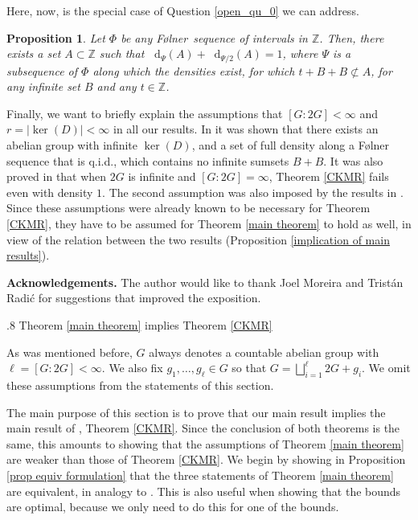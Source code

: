 \documentclass[reqno]{amsart}
\makeatletter
\def\Z{{\mathbb Z}}
\newcommand*\diff{\mathop{}\!\mathrm{d}}
\newtheorem{proposition}[theorem]{Proposition}
\theoremstyle{definition}
\theoremstyle{remark}
\def\section{\@startsection{section}{1}%
  \z@{.5\linespacing\@plus.7\linespacing}
{.8\baselineskip}%
  {\normalfont\fontsize{11}{13}\centering\bfseries}%
}
\theoremstyle{remark}
\newcommand{\Folner}{F\o{}lner}
\makeatother
\begin{document}
Here, now, is the special case of Question 
\ref{open_qu_0} we can address. 

\begin{proposition}\label{optimality in Z intro}
Let $\Phi$ be any \Folner\ sequence of intervals in $\Z$. 
Then, there 
exists a set $A\subset \Z$ such that 
$\diff_{\Psi}(A)+\diff_{\Psi/2}(A)=1$, 
where $\Psi$ is a subsequence of $\Phi$ along which the 
densities exist, for which $t+B+B \not \subset A$, for any 
infinite set $B$ 
and any $t\in \Z$.
\end{proposition}

Finally, we want to briefly explain the assumptions that 
$[G:2G]<\infty$ and $r=|\ker(D)|<\infty$ in all our results. 
In 
\cite[Section 5.1]{charamaras_kousek_mountakis_radic2025BBingroups} it was 
shown that there exists an abelian group with infinite 
$\ker(D)$, and a set of full density along a \Folner{} 
sequence that is q.i.d., which contains no infinite sumsets 
$B+B$. It was also proved in \cite[Section 5.3]{charamaras_kousek_mountakis_radic2025BBingroups} that when $2G$ is infinite and $[G:2G]=\infty$, Theorem \ref{CKMR} 
fails even with density $1$. The second assumption was also 
imposed by the results in \cite{ackelsberg2024counterexamples}. Since these assumptions 
were already known to be necessary for Theorem \ref{CKMR}, they have to be assumed for Theorem \ref{main theorem} to hold as well, in view of the relation between the two results (Proposition \ref{implication of main results}). 


\vspace{2mm} 
\noindent
\textbf{Acknowledgements.} 
The author would like to thank Joel Moreira and Trist{\'a}n 
Radi{\'c} for suggestions that improved the exposition.  


\section{Theorem \ref{main theorem} implies Theorem \ref{CKMR}}\label{section 2}

As was mentioned before, $G$ always denotes a countable 
abelian group with $\ell=[G: 2G]< \infty$. 
We also fix $g_1, \ldots, g_{\ell}\in G$ so that 
$G=\bigsqcup_{i=1} ^{\ell} 2G+g_i$. We omit these assumptions 
from the statements of this section. 

The main purpose of this section is to prove that our main 
result implies the main result of 
\cite{charamaras_kousek_mountakis_radic2025BBingroups}, Theorem \ref{CKMR}. Since 
the conclusion of both theorems is the same, this amounts to 
showing that the assumptions of Theorem \ref{main theorem} are weaker 
than those of Theorem \ref{CKMR}. We begin by showing
in Proposition \ref{prop equiv formulation} 
that the three statements of Theorem \ref{main theorem} are
equivalent, in analogy to 
\cite{charamaras_kousek_mountakis_radic2025BBingroups}. This 
is also useful when showing that the bounds are optimal, 
because we only need to do this for one of the bounds. 
\end{document}

